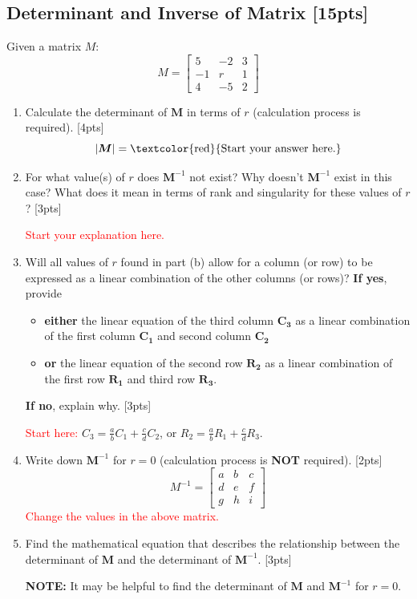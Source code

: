 \documentclass{article}
\begin{document}
\subsection{Determinant and Inverse of Matrix [15pts]}
Given a matrix $M$:
$$M = \begin{bmatrix} 
    5 & -2 & 3 \\ 
    -1 & r & 1 \\
    4 & -5 & 2
\end{bmatrix}$$
\begin{enumerate}[label=(\alph*)]
    \item Calculate the determinant of $\boldsymbol{M}$ in terms of $r$ (calculation process is required). [4pts]
    $$|\boldsymbol{M}| = \text{\textcolor{red}{Start your answer here.}} $$

    \item For what value(s) of $r$ does $\boldsymbol{M}^{-1}$ not exist? Why doesn't $\boldsymbol{M}^{-1}$ exist in this case? What does it mean in terms of rank and singularity for these values of $r$? [3pts]
    
    \textcolor{red}{Start your explanation here.} %
    
    \item Will all values of $r$ found in part (b) allow for a column (or row) to be expressed as a linear combination of the other columns (or rows)? \textbf{If yes}, provide
    \begin{itemize}
        \item \textbf{either} the linear equation of the third column $\boldsymbol{C_3}$ as a linear combination of the first column $\boldsymbol{C_1}$ and second column $\boldsymbol{C_2}$
        \item \textbf{or} the linear equation of the second row $\boldsymbol{R_2}$ as a linear combination of the first row $\boldsymbol{R_1}$ and third row $\boldsymbol{R_3}$.
    \end{itemize}
    \textbf{If no}, explain why. [3pts]


    \textcolor{red}{Start here: } $C_3 = \frac{a}{b}C_1 + \frac{c}{d}C_2$, or $R_2 = \frac{a}{b}R_1 + \frac{c}{d}R_3$.
    \item Write down $\boldsymbol{M}^{-1}$ for $r = 0$ (calculation process is \textbf{NOT} required). [2pts]
    $$ M^{-1} = \begin{bmatrix} 
        a & b & c \\ 
        d & e & f \\
        g & h & i
    \end{bmatrix}$$
    \textcolor{red}{Change the values in the above matrix.}
    \item Find the mathematical equation that describes the relationship between the determinant of $\boldsymbol{M}$ and the determinant of $\boldsymbol{M}^{-1}$. [3pts]
    \par\textbf{NOTE:} It may be helpful to find the determinant of $\boldsymbol{M}$ and $\boldsymbol{M}^{-1}$ for $r = 0$.
    
\end{enumerate}
\end{document}
